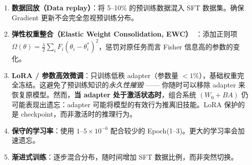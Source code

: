 \begin{enumerate}
  \item \textbf{数据回放（Data replay）}：将 5--10\% 的预训练数据混入 SFT 数据集。确保 Gradient 更新不会完全忽视预训练分布。
  \item \textbf{弹性权重整合（Elastic Weight Consolidation, EWC）}~\cite{kirkpatrick2017overcoming}：添加正则项 $\Omega(\theta) = \frac{\lambda}{2}\sum_i F_i(\theta_i - \theta_i^*)^2$，惩罚对原任务而言 Fisher 信息高的参数的变化。
  \item \textbf{LoRA / 参数高效微调}：只训练低秩 adapter（参数量 $<1\%$），基础权重完全冻结。这避免了预训练知识的\emph{永久性摧毁} —— 你随时可以移除 adapter 来恢复原模型。然而，\textbf{当 adapter 处于激活状态时}，组合系统 $(W_0 + BA)$ 仍可能表现出遗忘：adapter 可能将模型的有效行为推离旧技能。LoRA 保护的是 checkpoint，而非激活时的推理行为。
  \item \textbf{保守的学习率}：使用 $1$--$5 \times 10^{-6}$ 配合较少的 Epoch(1--3)。更大的学习率会加速遗忘。
  \item \textbf{渐进式训练}：逐步混合分布，随时间增加 SFT 数据比例，而非突然切换。
\end{enumerate}


